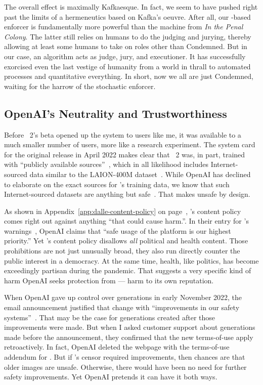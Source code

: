 The overall effect is maximally Kafkaesque. In fact, we seem to have pushed
right past the limits of a hermeneutics based on Kafka's oeuvre. After all, our
\AI-based enforcer is fundamentally more powerful than the machine from \emph{In
the Penal Colony}. The latter still relies on humans to do the judging and
jurying, thereby allowing at least some humans to take on roles other than
Condemned. But in our case, an algorithm acts as judge, jury, and executioner.
It has successfully exorcised even the last vestige of humanity from a world in
thrall to automated processes and quantitative everything. In short, now we all
are just Condemned, waiting for the harrow of the stochastic enforcer.


\subsection{OpenAI's Neutrality and Trustworthiness}

Before \DALLE~2's beta opened up the system to users like me, it was available
to a much smaller number of users, more like a research experiment. The system
card~\cite{GreenProcopeea2022,ProcopeCheemaea2022} for the original release in
April 2022 makes clear that \DALLE~2 was, in part, trained with ``publicly
available sources''~\cite{MishkinAhmad2022}, which in all likelihood includes
Internet-sourced data similar to the LAION-400M
dataset~\cite{SchuhmannVencuea2021}. While OpenAI has declined to elaborate on
the exact sources for \DALLE's training data, we know that such Internet-sourced
datasets are anything but safe~\cite{BirhanePrabhuea2021}. That makes \DALLE{}
unsafe by design.

As shown in Appendix~\ref{app:dalle-content-policy} on
page~\pageref{app:dalle-content-policy}, \DALLE's content policy comes right out
against anything ``that could cause harm.''. In their \FAQ{} entry for \DALLE's
warnings~\cite{Natalie2022}, OpenAI claims that ``safe usage of the platform is
our highest priority.'' Yet \DALLE's content policy disallows \emph{all}
political and health content. Those prohibitions are not just unusually broad,
they also run directly counter the public interest in a democracy. At the same
time, health, like politics, has become exceedingly partisan during the
pandemic. That suggests a very specific kind of harm OpenAI seeks protection
from --- harm to its own reputation.

When OpenAI gave up control over generations in early November 2022, the email
announcement justified that change with ``improvements in our safety
systems''~\cite{OpenAI2022g}. That may be the case for generations created after
those improvements were made. But when I asked customer support about
generations made before the announcement, they confirmed that the new
terms-of-use apply retroactively. In fact, OpenAI deleted the webpage with the
terms-of-use addendum for \DALLE. But if \DALLE's censor required improvements,
then chances are that older images are unsafe. Otherwise, there would have been
no need for further safety improvements. Yet OpenAI pretends it can have it both
ways.

